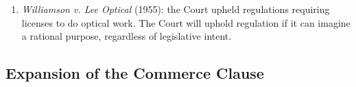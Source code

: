 \begin{enumerate}
    \begin{enumerate}
        \item \textbf{Footnote four}: the Court should apply heightened 
        scrutiny to provisions that (1) facially violate constitutional 
        provisions, (2) distorts political processes, or (3) affects discrete 
        and insular minorities.\footnote{Casebook p. 515.}
    \end{enumerate}
    \item \emph{Williamson v. Lee Optical} (1955): the Court upheld 
    regulations requiring licenses to do optical work. The Court will uphold 
    regulation if it can imagine a rational purpose, regardless of legislative 
    intent.
\end{enumerate}

\subsection{Expansion of the Commerce Clause}

